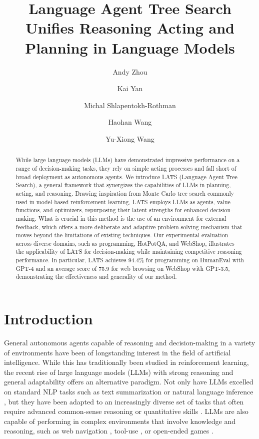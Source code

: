 \documentclass{article} \usepackage{iclr2024_conference,times}
\title{Language Agent Tree Search Unifies Reasoning Acting and Planning in Language Models}
\author[1,2]{{Andy Zhou}}
\author[1]{{Kai Yan}}
\author[1]{{Michal Shlapentokh-Rothman}}
\author[1]{{Haohan Wang}}
\author[1]{{Yu-Xiong Wang}}
\affil[1]{University of Illinois at Urbana-Champaign}
\affil[2]{AI@UIUC}
\affil[ ]{\texttt{\{andyz3,kaiyan3,michal5,haohanw,yxw\}@illinois.edu}}
\begin{document}
\maketitle

\begin{abstract}
While large language models (LLMs) have demonstrated impressive performance on a range of decision-making tasks, they rely on simple acting processes and fall short of broad deployment as autonomous agents. We introduce LATS (Language Agent Tree Search), a general framework that synergizes the capabilities of LLMs in planning, acting, and reasoning. Drawing inspiration from Monte Carlo tree search commonly used in model-based reinforcement learning, LATS employs LLMs as agents, value functions, and optimizers, repurposing their latent strengths for enhanced decision-making. What is crucial in this method is the use of an environment for external feedback, which offers a more deliberate and adaptive problem-solving mechanism that moves beyond the limitations of existing techniques. Our experimental evaluation across diverse domains, such as programming, HotPotQA, and WebShop, illustrates the applicability of LATS for decision-making while maintaining competitive reasoning performance. In particular, LATS achieves 94.4\% for programming on HumanEval with GPT-4 and an average score of 75.9 for web browsing on WebShop with GPT-3.5, demonstrating the effectiveness and generality of our method.
\end{abstract}
\section{Introduction}

General autonomous agents capable of reasoning and decision-making in a variety of environments \citep{wooldridge1995intelligent} have been of longstanding interest in the field of artificial intelligence. While this has traditionally been studied in reinforcement learning, the recent rise of large language models (LLMs) \citep{GPT3, chowdhery2022palm, touvron2023llama, openai2023gpt4} with strong reasoning and general adaptability offers an alternative paradigm. Not only have LLMs excelled on standard NLP tasks such as text summarization \citep{nallapati2016abstractive} or natural language inference \citep{bowman2015large}, but they have been adapted to an increasingly diverse set of tasks that often require advanced common-sense reasoning or quantitative skills \citep{cobbe2021training, saparov2022language}. LLMs are also capable of performing in complex environments that involve knowledge and reasoning, such as web navigation \citep{yao2022webshop, deng2023mind2web}, tool-use \citep{schick2023toolformer}, or open-ended games \citep{fan2022minedojo}. 
\end{document}
